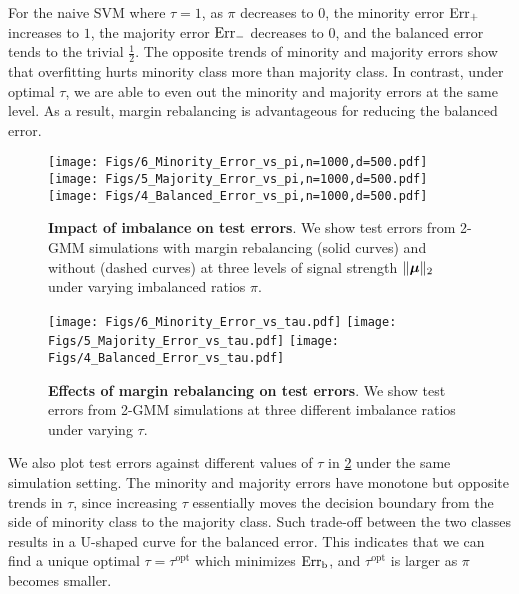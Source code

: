 
For the naive SVM where $\tau = 1$, as $\pi$ decreases to $0$, the minority error $\mathrm{Err}_+$ increases to $1$, the majority error $\mathrm{Err}_-$ decreases to $0$, and the balanced error tends to the trivial $\frac12$. The opposite trends of minority and majority errors show that overfitting hurts minority class more than majority class. In contrast, under optimal $\tau$, we are able to even out the minority and majority errors at the same level. As a result, margin rebalancing is advantageous for reducing the balanced error.

\begin{figure}[t]
    \centering
    \texttt{[image: Figs/6\_Minority\_Error\_vs\_pi,n=1000,d=500.pdf]}
    \texttt{[image: Figs/5\_Majority\_Error\_vs\_pi,n=1000,d=500.pdf]}
    \texttt{[image: Figs/4\_Balanced\_Error\_vs\_pi,n=1000,d=500.pdf]}
    \caption{
    \textbf{Impact of imbalance on test errors}. We show test errors from 2-GMM simulations with margin rebalancing (solid curves) and without (dashed curves) at three levels of signal strength $\| {\boldsymbol{\mu}}\|_2$ under varying imbalanced ratios $\pi$.
    }
    \label{fig:Err_pi}
\end{figure}

\begin{figure}[t]
    \centering
    \texttt{[image: Figs/6\_Minority\_Error\_vs\_tau.pdf]}
    \texttt{[image: Figs/5\_Majority\_Error\_vs\_tau.pdf]}
    \texttt{[image: Figs/4\_Balanced\_Error\_vs\_tau.pdf]}
    \caption{
    \textbf{Effects of margin rebalancing on test errors}. We show test errors from 2-GMM simulations at three different imbalance ratios under varying $\tau$.
    }
    \label{fig:Err_tau}
\end{figure}

We also plot test errors against different values of $\tau$ in \cref{fig:Err_tau} under the same simulation setting. The minority and majority errors have monotone but opposite trends in $\tau$, since increasing $\tau$ essentially moves the decision boundary from the side of minority class to the majority class. Such trade-off between the two classes results in a U-shaped curve for the balanced error. This indicates that we can find a unique optimal $\tau=\tau^{\mathrm{opt}}$ which minimizes $\mathrm{Err}_\mathrm{b}$, and $\tau^{\mathrm{opt}}$ is larger as $\pi$ becomes smaller.


